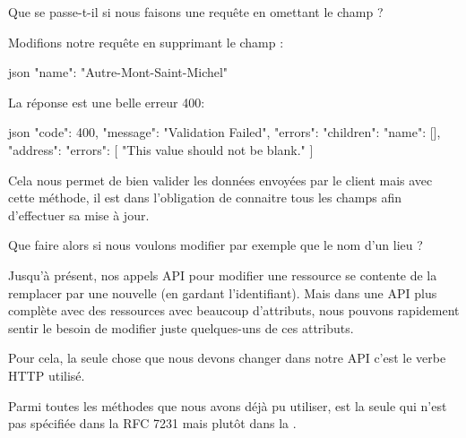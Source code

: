 \documentclass[big]{zmdocument}
\begin{document}
\begin{Question}
Que se passe-t-il si nous faisons une requête en omettant le champ  ?
\end{Question}


Modifions notre requête en supprimant le champ  :



\begin{CodeBlock}{json}
{
    "name": "Autre-Mont-Saint-Michel"
}
\end{CodeBlock}



La réponse est une belle erreur 400:



\begin{CodeBlock}{json}
{
  "code": 400,
  "message": "Validation Failed",
  "errors": {
    "children": {
      "name": [],
      "address": {
        "errors": [
          "This value should not be blank."
        ]
      }
    }
  }
}
\end{CodeBlock}



Cela nous permet de bien valider les données envoyées par le client mais avec cette méthode, il est dans l'obligation de connaitre tous les champs afin d'effectuer sa mise à jour.





\begin{Question}
Que faire alors si nous voulons modifier par exemple que le nom d'un lieu ?
\end{Question}


Jusqu'à présent, nos appels API pour modifier une ressource se contente de la remplacer par une nouvelle (en gardant l'identifiant). Mais dans une API plus complète avec des ressources avec beaucoup d'attributs, nous pouvons rapidement sentir le besoin de modifier juste quelques-uns de ces attributs.



Pour cela, la seule chose que nous devons changer dans notre API c'est le verbe HTTP utilisé.





Parmi toutes les méthodes que nous avons déjà pu utiliser,  est la seule qui n'est pas spécifiée dans la RFC 7231 mais plutôt dans la .
\end{document}
